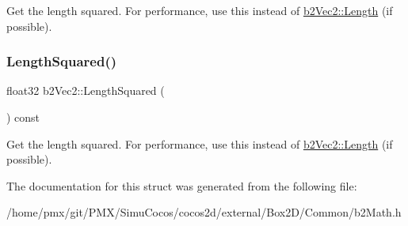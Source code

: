 Get the length squared. For performance, use this instead of \hyperlink{structb2Vec2_a04cb9ac9e845a59f4212b2d7149fa3d9}{b2\+Vec2\+::\+Length} (if possible). \mbox{\label{structb2Vec2_af8a081dac7eea7800fdbfbf95ac9e395}} 
\subsubsection{\texorpdfstring{Length\+Squared()}{LengthSquared()}\hspace{0.1cm}{\footnotesize\ttfamily [2/2]}}
{\footnotesize\ttfamily float32 b2\+Vec2\+::\+Length\+Squared (\begin{DoxyParamCaption}{ }\end{DoxyParamCaption}) const\hspace{0.3cm}{\ttfamily [inline]}}

Get the length squared. For performance, use this instead of \hyperlink{structb2Vec2_a04cb9ac9e845a59f4212b2d7149fa3d9}{b2\+Vec2\+::\+Length} (if possible). 

The documentation for this struct was generated from the following file\+:\begin{DoxyCompactItemize}
\item 
/home/pmx/git/\+P\+M\+X/\+Simu\+Cocos/cocos2d/external/\+Box2\+D/\+Common/b2\+Math.\+h\end{DoxyCompactItemize}
